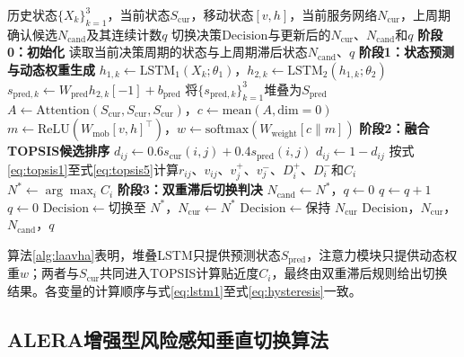 \documentclass[10pt,a4paper]{ctexart}
\begin{document}
\begin{algorithm}[H]
\caption{LAAVHA垂直切换决策流程}
\label{alg:laavha}
\small
\begin{algorithmic}[1]
\Require 历史状态$\{X_k\}_{k=1}^{3}$，当前状态$S_{\mathrm{cur}}$，移动状态$[v,h]$，当前服务网络$N_{\mathrm{cur}}$，上周期确认候选$N_{\mathrm{cand}}$及其连续计数$q$
\Ensure 切换决策$\mathrm{Decision}$与更新后的$N_{\mathrm{cur}}$、$N_{\mathrm{cand}}$和$q$
\State \textbf{阶段0：初始化}
\State 读取当前决策周期的状态与上周期滞后状态$N_{\mathrm{cand}}$、$q$
\State \textbf{阶段1：状态预测与动态权重生成}
    \State $h_{1,k}\gets\mathrm{LSTM}_1(X_k;\theta_1)$，$h_{2,k}\gets\mathrm{LSTM}_2(h_{1,k};\theta_2)$
    \State $s_{\mathrm{pred},k}\gets W_{\mathrm{pred}}h_{2,k}[-1]+b_{\mathrm{pred}}$
\EndFor
\State 将$\{s_{\mathrm{pred},k}\}_{k=1}^{3}$堆叠为$S_{\mathrm{pred}}$
\State $A\gets\mathrm{Attention}(S_{\mathrm{cur}},S_{\mathrm{cur}},S_{\mathrm{cur}})$，$c\gets\mathrm{mean}(A,\mathrm{dim}=0)$
\State $m\gets\mathrm{ReLU}(W_{\mathrm{mob}}[v,h]^\top)$，$w\gets\mathrm{softmax}(W_{\mathrm{weight}}[c\parallel m])$
\State \textbf{阶段2：融合TOPSIS候选排序}
        \State $d_{ij}\gets0.6s_{\mathrm{cur}}(i,j)+0.4s_{\mathrm{pred}}(i,j)$
         $d_{ij}\gets1-d_{ij}$ \EndIf
    \EndFor
\EndFor
\State 按式\eqref{eq:topsis1}至式\eqref{eq:topsis5}计算$r_{ij}$、$v_{ij}$、$v_j^+$、$v_j^-$、$D_i^+$、$D_i^-$和$C_i$
\State $N^*\gets\arg\max_i C_i$
\State \textbf{阶段3：双重滞后切换判决}
    \State $N_{\mathrm{cand}}\gets N^*$，$q\gets0$
\EndIf
{}
    \State $q\gets q+1$
\Else
    \State $q\gets0$
\EndIf
{}
    \State $\mathrm{Decision}\gets\text{切换至 }N^*$，$N_{\mathrm{cur}}\gets N^*$
\Else
    \State $\mathrm{Decision}\gets\text{保持 }N_{\mathrm{cur}}$
\EndIf
\State \Return $\mathrm{Decision}$，$N_{\mathrm{cur}}$，$N_{\mathrm{cand}}$，$q$
\end{algorithmic}
\end{algorithm}

算法\ref{alg:laavha}表明，堆叠LSTM只提供预测状态$S_{\mathrm{pred}}$，注意力模块只提供动态权重$w$；两者与$S_{\mathrm{cur}}$共同进入TOPSIS计算贴近度$C_i$，最终由双重滞后规则给出切换结果。各变量的计算顺序与式\eqref{eq:lstm1}至式\eqref{eq:hysteresis}一致。

\subsection{ALERA增强型风险感知垂直切换算法}
\end{document}
